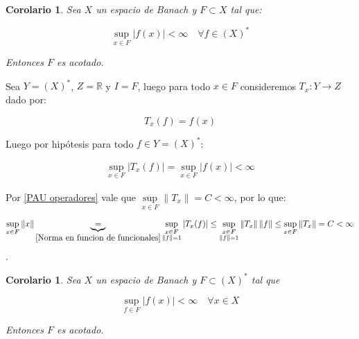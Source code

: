 \documentclass[11pt]{article}
\newcommand{\R}{{\mathbb{R}}}
\newcommand{\dual}[1]{\left(#1\right)^{\ast}}
\newcommand{\norm}[1]{\left\lVert#1\right\rVert}
\newcommand{\abs}[1]{\left\lvert#1\right\rvert}
\numberwithin{theorem}{subsection}
\newtheorem{corollary}[theorem]{Corolario}
\newenvironment{proof}[1][Demostraci\'on]{\begin{trivlist}
		\item[\hskip \labelsep {\bfseries #1}]}{\end{trivlist}}
\newcommand{\qed}{\nobreak \ifvmode \relax \else
	\ifdim\lastskip<1.5em \hskip-\lastskip
	\hskip1.5em plus0em minus0.5em \fi \nobreak
	\vrule height0.75em width0.5em depth0.25em\fi}
\begin{document}
\begin{corollary}
	\label{PAU X}
	Sea $X$ un espacio de Banach y $F \subset X$ tal que:
	
	\begin{equation*}
		\sup\limits_{x \in F} \abs{f(x)} < \infty \quad \forall f \in \dual{X}
	\end{equation*}
	
	Entonces $F$ es acotado.
	
\end{corollary}

\begin{proof}
	Sea $Y = \dual{X}$, $Z=\R$ y $I = F$, luego para todo $x \in F$ consideremos $T_x : Y \rightarrow Z$ dado por:
	
	\[
		T_x(f) = f(x)
	\]
	
	Luego por hip\'otesis para todo $f \in Y = \dual{X}$:
	
	\[
	\begin{aligned}
		\sup\limits_{x \in F} \abs{T_x(f)} = \sup\limits_{x \in F} \abs{f(x)} < \infty
	\end{aligned}
	\]
	
	Por \ref{PAU operadores} vale que $\sup\limits_{x \in F} \norm{T_x} = C < \infty$, por lo que:
	
	\[
	\sup\limits_{x \in F} \norm{x} \underbrace{=}_{\ref{Norma en funcion de funcionales}} \sup\limits_{\substack{x \in F \\ \norm{f} = 1}} \abs{T_x(f)} \leq \sup\limits_{\substack{x \in F \\ \norm{f} = 1}} \norm{T_x}\norm{f} \leq \sup\limits_{\substack{x \in F }} \norm{T_x} = C < \infty
	\]
	.\qed
	
	
\end{proof}

\begin{corollary}
	\label{PAU X dual}
	Sea $X$ un espacio de Banach y $F \subset \dual{X}$ tal que
	
	\begin{equation*}
	\sup\limits_{f \in F} \abs{f(x)} < \infty \quad \forall x \in X
	\end{equation*}
	
	Entonces $F$ es acotado.
	
\end{corollary}
\end{document}
